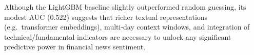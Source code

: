 \documentclass[11pt,a4paper]{article}
\begin{document}
\noindent
Although the LightGBM baseline slightly outperformed random guessing, its modest AUC (0.522) suggests that richer textual representations (e.g.\ transformer embeddings), multi-day context windows, and integration of technical/fundamental indicators are necessary to unlock any significant predictive power in financial news sentiment.
\end{document}

